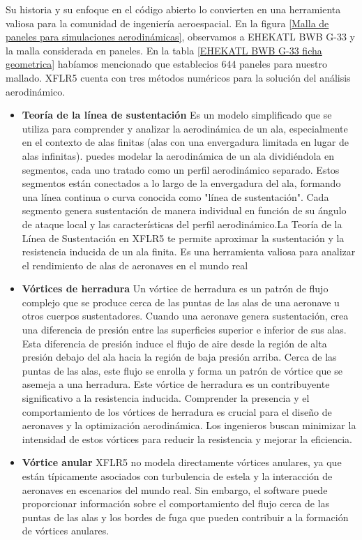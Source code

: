   Su historia y su enfoque en el código abierto lo convierten en una herramienta valiosa para la comunidad de ingeniería aeroespacial.
%
En la figura \ref{Malla de paneles para simulaciones aerodinámicas}, observamos a EHEKATL BWB G-33 y la malla considerada en paneles.  En la tabla \ref{EHEKATL BWB G-33 ficha geometrica} habíamos mencionado que establecios 644 paneles para nuestro mallado. 
XFLR5 cuenta con tres métodos numéricos para la solución del análisis aerodinámico. 
\begin{itemize}
    \item \textbf{Teoría de la línea de sustentación} Es un modelo simplificado que se utiliza para comprender y analizar la aerodinámica de un ala, especialmente en el contexto de alas finitas (alas con una envergadura limitada en lugar de alas infinitas). puedes modelar la aerodinámica de un ala dividiéndola en segmentos, cada uno tratado como un perfil aerodinámico separado. Estos segmentos están conectados a lo largo de la envergadura del ala, formando una línea continua o curva conocida como "línea de sustentación". Cada segmento genera sustentación de manera individual en función de su ángulo de ataque local y las características del perfil aerodinámico.La Teoría de la Línea de Sustentación en XFLR5 te permite aproximar la sustentación y la resistencia inducida de un ala finita. Es una herramienta valiosa para analizar el rendimiento de alas de aeronaves en el mundo real
    \item \textbf{Vórtices de herradura} Un vórtice de herradura es un patrón de flujo complejo que se produce cerca de las puntas de las alas de una aeronave u otros cuerpos sustentadores. Cuando una aeronave genera sustentación, crea una diferencia de presión entre las superficies superior e inferior de sus alas. Esta diferencia de presión induce el flujo de aire desde la región de alta presión debajo del ala hacia la región de baja presión arriba. Cerca de las puntas de las alas, este flujo se enrolla y forma un patrón de vórtice que se asemeja a una herradura. Este vórtice de herradura es un contribuyente significativo a la resistencia inducida.
 Comprender la presencia y el comportamiento de los vórtices de herradura es crucial para el diseño de aeronaves y la optimización aerodinámica. Los ingenieros buscan minimizar la intensidad de estos vórtices para reducir la resistencia y mejorar la eficiencia.
    \item \textbf{Vórtice anular} XFLR5 no modela directamente vórtices anulares, ya que están típicamente asociados con turbulencia de estela y la interacción de aeronaves en escenarios del mundo real. Sin embargo, el software puede proporcionar información sobre el comportamiento del flujo cerca de las puntas de las alas y los bordes de fuga que pueden contribuir a la formación de vórtices anulares. 

\end{itemize}

